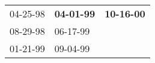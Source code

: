\begin{supertabular}{p{0.33\columnwidth}p{0.33\columnwidth}p{0.33\columnwidth}}
 04-25-98\textsuperscript{} &  \textbf{04-01-99\textsuperscript{}} &  \textbf{10-16-00\textsuperscript{}} \\
 08-29-98\textsuperscript{} &           06-17-99\textsuperscript{} &                                      \\
 01-21-99\textsuperscript{} &           09-04-99\textsuperscript{} &                                      \\
\end{supertabular}
